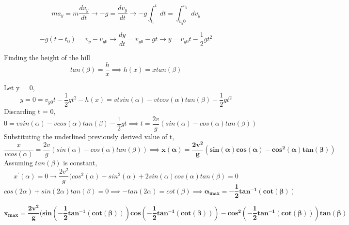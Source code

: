 \documentclass[12pt]{article}
\begin{document}
$$
m a_y = m \frac{d v_y}{dt} \rightarrow  -g = \frac{d v_y}{dt} \rightarrow -g \int^{t}_{t_0} dt = \int^{v_y}_{v_y0} d v_y
$$

$$
-g(t - t_0) = v_y - v_{y0} \rightarrow \frac{dy}{dt} = v_{y0} - gt \rightarrow y = v_{y0}t - \frac{1}{2}gt^2
$$

Finding the height of the hill
$$
tan(\beta) = \frac{h}{x} \implies h(x) = xtan(\beta)
$$

Let y = 0, 
$$
y = 0 = v_{y0}t - \frac{1}{2}gt^2 - h(x) = vtsin(\alpha) - vtcos(\alpha)tan(\beta) - \frac{1}{2}gt^2
$$
Discarding t = 0,
$$
0 = vsin(\alpha) - vcos(\alpha)tan(\beta) - \frac{1}{2}gt \implies t = \frac{2v}{g}(sin(\alpha) - cos(\alpha)tan(\beta))
$$
Substituting the underlined previously derived value of t, 
$$
\frac{x}{vcos(\alpha)} =  \frac{2v}{g}(sin(\alpha) - cos(\alpha)tan(\beta)) \implies \boldsymbol{x(\alpha) = \frac{2v^2}{g}(sin(\alpha)cos(\alpha) - cos^2(\alpha)tan(\beta))}
$$
Assuming $tan(\beta)$ is constant,
$$
x^{\prime}(\alpha) = 0 \rightarrow \frac{2v^2}{g}(cos^2(\alpha) - sin^2(\alpha) + 2sin(\alpha)cos(\alpha)tan(\beta) = 0
$$
$$
cos(2\alpha) + sin(2\alpha)tan(\beta) = 0 \implies -tan(2\alpha) = cot(\beta) \implies \boldsymbol{\alpha_{max} = -\frac{1}{2}tan^{-1}(cot(\beta))}
$$

$$
\boldsymbol{x_{max} = \frac{2v^2}{g}(sin(-\frac{1}{2}tan^{-1}(cot(\beta)))cos(-\frac{1}{2}tan^{-1}(cot(\beta))) - cos^2(-\frac{1}{2}tan^{-1}(cot(\beta)))tan(\beta)}
$$
\end{document}

